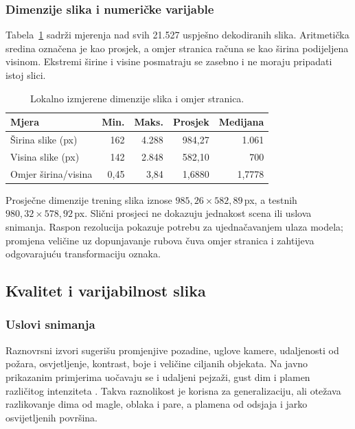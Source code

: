 \subsubsection{Dimenzije slika i numeričke varijable}
Tabela~\ref{tab:prof-dimenzije} sadrži mjerenja nad svih 21.527 uspješno dekodiranih slika. Aritmetička sredina označena je kao prosjek, a omjer stranica računa se kao širina podijeljena visinom. Ekstremi širine i visine posmatraju se zasebno i ne moraju pripadati istoj slici.

\begin{table}[H]
\centering
\small
\begin{tabular}{@{}lrrrr@{}}
\toprule
\textbf{Mjera} & \textbf{Min.} & \textbf{Maks.} & \textbf{Prosjek} & \textbf{Medijana}\\
\midrule
Širina slike (px) & 162 & 4.288 & 984,27 & 1.061\\
Visina slike (px) & 142 & 2.848 & 582,10 & 700\\
Omjer širina/visina & 0,45 & 3,84 & 1,6880 & 1,7778\\
\bottomrule
\end{tabular}
\caption{Lokalno izmjerene dimenzije slika i omjer stranica.}
\label{tab:prof-dimenzije}
\end{table}

Prosječne dimenzije trening slika iznose $985,26\times 582,89$\,px, a testnih $980,32\times 578,92$\,px. Slični prosjeci ne dokazuju jednakost scena ili uslova snimanja. Raspon rezolucija pokazuje potrebu za ujednačavanjem ulaza modela; promjena veličine uz dopunjavanje rubova čuva omjer stranica i zahtijeva odgovarajuću transformaciju oznaka.

\subsection{Kvalitet i varijabilnost slika}

\subsubsection{Uslovi snimanja}
Raznovrsni izvori sugerišu promjenjive pozadine, uglove kamere, udaljenosti od požara, osvjetljenje, kontrast, boje i veličine ciljanih objekata. Na javno prikazanim primjerima uočavaju se i udaljeni pejzaži, gust dim i plamen različitog intenziteta \cite{dfire}. Takva raznolikost je korisna za generalizaciju, ali otežava razlikovanje dima od magle, oblaka i pare, a plamena od odsjaja i jarko osvijetljenih površina.

